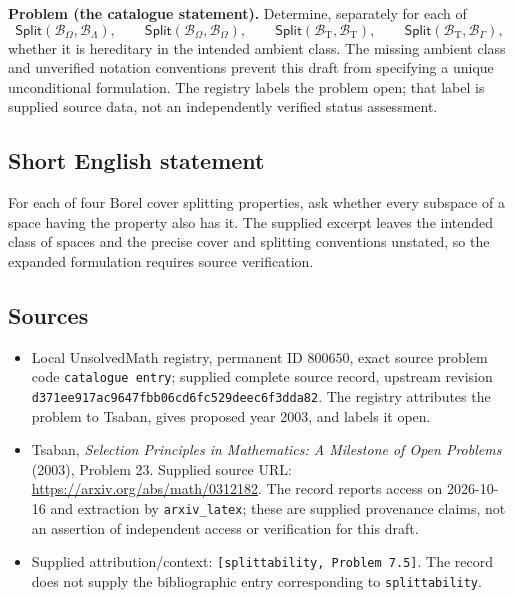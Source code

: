 \documentclass[11pt]{article}
\begin{document}
\textbf{Problem (the catalogue statement).} Determine, separately for each of
\[
\mathsf{Split}(\mathcal B_\Omega,\mathcal B_\Lambda),\qquad
\mathsf{Split}(\mathcal B_\Omega,\mathcal B_\Omega),\qquad
\mathsf{Split}(\mathcal B_{\mathrm T},\mathcal B_{\mathrm T}),\qquad
\mathsf{Split}(\mathcal B_{\mathrm T},\mathcal B_\Gamma),
\]
whether it is hereditary in the intended ambient class. The missing ambient class and unverified notation conventions prevent this draft from specifying a unique unconditional formulation. The registry labels the problem open; that label is supplied source data, not an independently verified status assessment.
\subsection{Short English statement}
For each of four Borel cover splitting properties, ask whether every subspace of a space having the property also has it. The supplied excerpt leaves the intended class of spaces and the precise cover and splitting conventions unstated, so the expanded formulation requires source verification.
\subsection{Sources}
\begin{itemize}
\item Local UnsolvedMath registry, permanent ID \(800650\), exact source problem code \texttt{catalogue entry}; supplied complete source record, upstream revision \texttt{d371ee917ac9647fbb06cd6fc529deec6f3dda82}. The registry attributes the problem to Tsaban, gives proposed year 2003, and labels it open.
\item Tsaban, \emph{Selection Principles in Mathematics: A Milestone of Open Problems} (2003), Problem 23. Supplied source URL: \url{https://arxiv.org/abs/math/0312182}. The record reports access on 2026-10-16 and extraction by \texttt{arxiv\_latex}; these are supplied provenance claims, not an assertion of independent access or verification for this draft.
\item Supplied attribution/context: \texttt{[splittability, Problem 7.5]}. The record does not supply the bibliographic entry corresponding to \texttt{splittability}.
\end{itemize}
\end{document}
